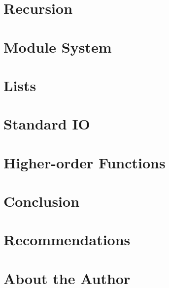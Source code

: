 \documentclass[12pt, obeyspaces]{report}
\begin{document}
	\chapter{Recursion}
	
	
	\chapter{Module System}
	
	
	\chapter{Lists}
	
	
	\chapter{Standard IO}
	
	
	\chapter{Higher-order Functions}
	
	
	\chapter*{Conclusion}
	
	
	\chapter*{Recommendations}
	
	
	\chapter*{About the Author}
	
	
	\appendix
	
	
\end{document}
